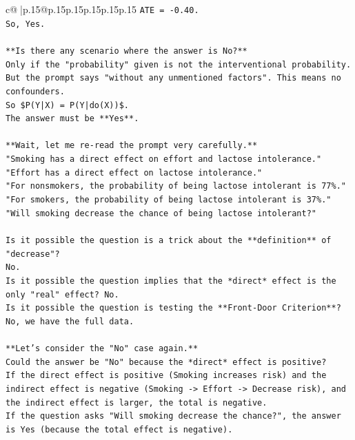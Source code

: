 \documentclass{article}
\begin{document}
{\begin{supertabular}{c@{$\;$}|p{.15\linewidth}@{}p{.15\linewidth}p{.15\linewidth}p{.15\linewidth}p{.15\linewidth}p{.15\linewidth}}
{{{\texttt{ATE = {-}0.40.} \\
\texttt{So, Yes.} \\
\\ 
\texttt{**Is there any scenario where the answer is No?**} \\
\texttt{Only if the "probability" given is not the interventional probability.} \\
\texttt{But the prompt says "without any unmentioned factors". This means no confounders.} \\
\texttt{So \$P(Y|X) = P(Y|do(X))\$.} \\
\texttt{The answer must be **Yes**.} \\
\\ 
\texttt{**Wait, let me re{-}read the prompt very carefully.**} \\
\texttt{"Smoking has a direct effect on effort and lactose intolerance."} \\
\texttt{"Effort has a direct effect on lactose intolerance."} \\
\texttt{"For nonsmokers, the probability of being lactose intolerant is 77\%."} \\
\texttt{"For smokers, the probability of being lactose intolerant is 37\%."} \\
\texttt{"Will smoking decrease the chance of being lactose intolerant?"} \\
\\ 
\texttt{Is it possible the question is a trick about the **definition** of "decrease"?} \\
\texttt{No.} \\
\texttt{Is it possible the question implies that the *direct* effect is the only "real" effect? No.} \\
\texttt{Is it possible the question is testing the **Front{-}Door Criterion**? No, we have the full data.} \\
\\ 
\texttt{**Let's consider the "No" case again.**} \\
\texttt{Could the answer be "No" because the *direct* effect is positive?} \\
\texttt{If the direct effect is positive (Smoking increases risk) and the indirect effect is negative (Smoking {-}> Effort {-}> Decrease risk), and the indirect effect is larger, the total is negative.} \\
\texttt{If the question asks "Will smoking decrease the chance?", the answer is Yes (because the total effect is negative).} \\
}}}
\end{supertabular}}
\end{document}
